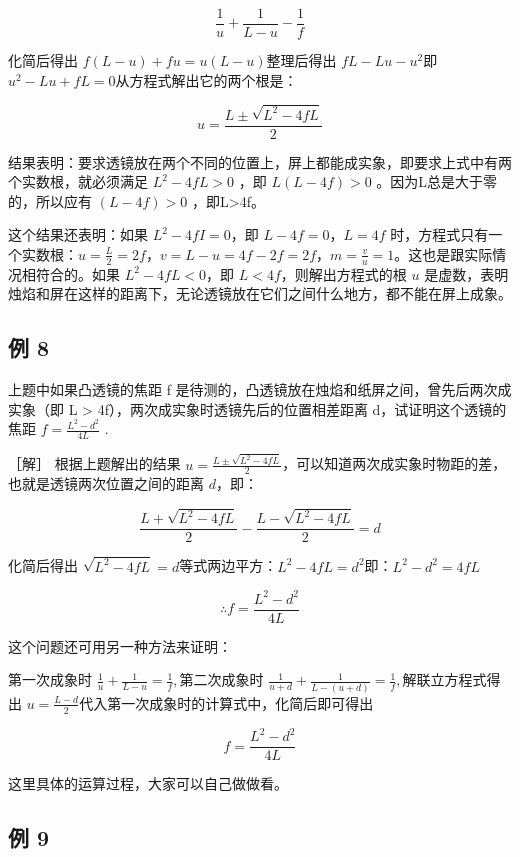 \[
\frac {1}{u} + \frac {1}{L - u} - \frac {1}{f}
\]

化简后得出 \(f(L - u) + fu = u(L - u)\)整理后得出 \(fL - Lu - u^2\)即
\(u^{2} - L u + f L = 0\)从方程式解出它的两个根是：

\[
u = \frac {L \pm \sqrt {L ^ {2} - 4 f L}}{2}
\]

结果表明：要求透镜放在两个不同的位置上，屏上都能成实象，即要求上式中有两个实数根，就必须满足
\(L^{2}-4fL>0\) ，即 \(L(L-4f)>0\) 。因为L总是大于零的，所以应有
\((L-4f)>0\) ，即L\textgreater4f。

这个结果还表明：如果 \(L^2 - 4fI = 0\)，即 \(L - 4f = 0\)，\(L = 4f\)
时，方程式只有一个实数根：\(u = \frac{L}{2} = 2f\)，\(v = L - u = 4f - 2f = 2f\)，\(m = \frac{v}{u} = 1\)。这也是跟实际情况相符合的。如果
\(L^2 - 4fL < 0\)，即 \(L < 4f\)，则解出方程式的根 \(u\)
是虚数，表明烛焰和屏在这样的距离下，无论透镜放在它们之间什么地方，都不能在屏上成象。

\subsection{例 8}

上题中如果凸透镜的焦距 f
是待测的，凸透镜放在烛焰和纸屏之间，曾先后两次成实象（即 L
\textgreater{} 4f），两次成实象时透镜先后的位置相差距离
d，试证明这个透镜的焦距 \(f = \frac{L^{2} - d^{2}}{4L}\) .

［解］ 根据上题解出的结果
\(u = \frac{L \pm \sqrt{L^2 - 4fL}}{2}\)，可以知道两次成实象时物距的差，也就是透镜两次位置之间的距离
\(d\)，即：

\[
\frac {L + \sqrt {L ^ {2} - 4 f L}}{2} - \frac {L - \sqrt {L ^ {2} - 4 f L}}{2} = d
\]

化简后得出
\(\sqrt{L^2 - 4fL} = d\)等式两边平方：\(L^2 -4fL = d^2\)即：\(L^2 -d^2 = 4fL\)

\[
\therefore f = \frac {L ^ {2} - d ^ {2}}{4 L}
\]

这个问题还可用另一种方法来证明：

第一次成象时 \(\frac{1}{u} +\frac{1}{L - u} = \frac{1}{f},\)第二次成象时
\(\frac{1}{u + d} +\frac{1}{L - (u + d)} = \frac{1}{f},\)解联立方程式得出
\(u = \frac{L - d}{2}\)代入第一次成象时的计算式中，化简后即可得出

\[
f = \frac {L ^ {2} - d ^ {2}}{4 L}
\]

这里具体的运算过程，大家可以自己做做看。

\subsection{例 9}

